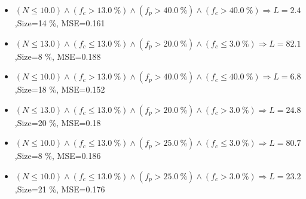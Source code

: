 \documentclass[numbered]{CSL}
\begin{document}
\begin{itemize}
\item $(N \leq 10.0) \land (f_c > 13.0~\%) \land (f_p > 40.0~\%) \land (f_c > 40.0~\%) \Rightarrow L = 2.4$,\hfill Size=14 \%, MSE=0.161
\item $(N \leq 13.0) \land (f_c \leq 13.0~\%) \land (f_p > 20.0~\%) \land (f_c \leq 3.0~\%) \Rightarrow L = 82.1$,\hfill Size=8 \%, MSE=0.188
\item $(N \leq 10.0) \land (f_c > 13.0~\%) \land (f_p > 40.0~\%) \land (f_c \leq 40.0~\%) \Rightarrow L = 6.8$,\hfill Size=18 \%, MSE=0.152
\item $(N \leq 13.0) \land (f_c \leq 13.0~\%) \land (f_p > 20.0~\%) \land (f_c > 3.0~\%) \Rightarrow L = 24.8$,\hfill Size=20 \%, MSE=0.18
\item $(N \leq 10.0) \land (f_c \leq 13.0~\%) \land (f_p > 25.0~\%) \land (f_c \leq 3.0~\%) \Rightarrow L = 80.7$,\hfill Size=8 \%, MSE=0.186
\item $(N \leq 10.0) \land (f_c \leq 13.0~\%) \land (f_p > 25.0~\%) \land (f_c > 3.0~\%) \Rightarrow L = 23.2$,\hfill Size=21 \%, MSE=0.176
\end{itemize}
\end{document}
